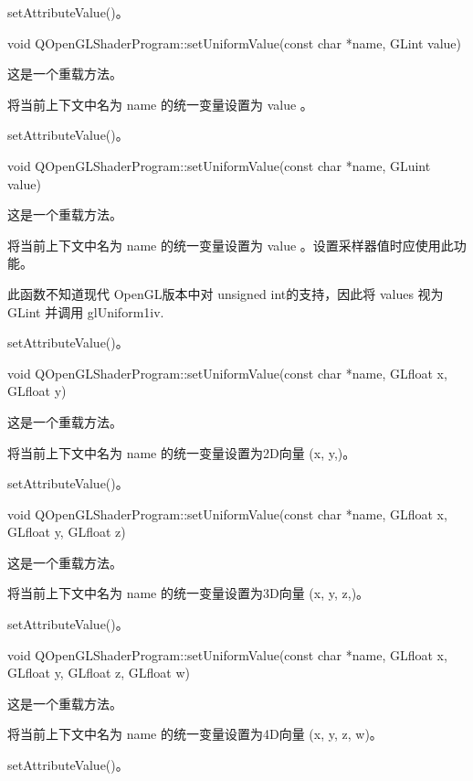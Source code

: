 \begin{seeAlso}
setAttributeValue()。
\end{seeAlso}

void QOpenGLShaderProgram::setUniformValue(const char *name, GLint value)

这是一个重载方法。

将当前上下文中名为 name 的统一变量设置为 value 。

\begin{seeAlso}
setAttributeValue()。
\end{seeAlso}

void QOpenGLShaderProgram::setUniformValue(const char *name, GLuint value)

这是一个重载方法。

将当前上下文中名为 name 的统一变量设置为 value 。设置采样器值时应使用此功能。

\begin{notice}
此函数不知道现代 OpenGL版本中对 unsigned int的支持，因此将 values 视为 GLint 并调用 glUniform1iv.
\end{notice}

\begin{seeAlso}
setAttributeValue()。
\end{seeAlso}

void QOpenGLShaderProgram::setUniformValue(const char *name, GLfloat x, GLfloat y)

这是一个重载方法。

将当前上下文中名为 name 的统一变量设置为2D向量 (x, y,)。

\begin{seeAlso}
setAttributeValue()。
\end{seeAlso}

void QOpenGLShaderProgram::setUniformValue(const char *name, GLfloat x, GLfloat y, GLfloat z)

这是一个重载方法。

将当前上下文中名为 name 的统一变量设置为3D向量 (x, y, z,)。


\begin{seeAlso}
setAttributeValue()。
\end{seeAlso}

void QOpenGLShaderProgram::setUniformValue(const char *name, GLfloat x, GLfloat y, GLfloat z, GLfloat w)

这是一个重载方法。

将当前上下文中名为 name 的统一变量设置为4D向量 (x, y, z, w)。

\begin{seeAlso}
setAttributeValue()。
\end{seeAlso}

